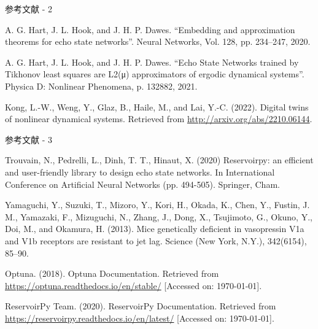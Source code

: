 \begin{frame}{参考文献 - 2}
  \begin{thebibliography}{99}    
      A. G. Hart, J. L. Hook, and J. H. P. Dawes. “Embedding and approximation theorems for echo state networks”. Neural Networks, Vol. 128, pp. 234–247, 2020.

      A. G. Hart, J. L. Hook, and J. H. P. Dawes. “Echo State Networks trained by Tikhonov least squares are L2(μ) approximators of ergodic dynamical systems”. Physica D: Nonlinear Phenomena, p. 132882, 2021.

      Kong, L.-W., Weng, Y., Glaz, B., Haile, M., and Lai, Y.-C. (2022). Digital twins of nonlinear dynamical systems. Retrieved from \url{http://arxiv.org/abs/2210.06144}. 
  \end{thebibliography}
\end{frame}


\begin{frame}{参考文献 - 3}
    \begin{thebibliography}{99}   
      

        Trouvain, N., Pedrelli, L., Dinh, T. T., Hinaut, X. (2020) Reservoirpy: an efficient and user-friendly library to design echo state networks. In International Conference on Artificial Neural Networks (pp. 494-505). Springer, Cham.
        
        Yamaguchi, Y., Suzuki, T., Mizoro, Y., Kori, H., Okada, K., Chen, Y., Fustin, J. M., Yamazaki, F., Mizuguchi, N., Zhang, J., Dong, X., Tsujimoto, G., Okuno, Y., Doi, M., and Okamura, H. (2013). Mice genetically deficient in vasopressin V1a and V1b receptors are resistant to jet lag. Science (New York, N.Y.), 342(6154), 85–90.

        Optuna. (2018). Optuna Documentation. Retrieved from \url{https://optuna.readthedocs.io/en/stable/} [Accessed on: \today].

        ReservoirPy Team. (2020). ReservoirPy Documentation. Retrieved from \url{https://reservoirpy.readthedocs.io/en/latest/} [Accessed on: \today].

    \end{thebibliography}
\end{frame}
